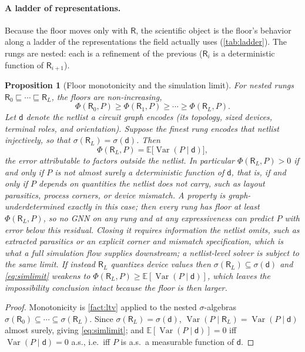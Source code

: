 \documentclass[10pt]{article}
\newtheorem{proposition}{Proposition}
\newcommand{\E}{\mathbb{E}}
\newcommand{\Var}{\operatorname{Var}}
\newcommand{\R}{\mathsf{R}}
\newcommand{\design}{\mathsf{d}}
\begin{document}
\paragraph{A ladder of representations.}
Because the floor moves only with $\R$, the scientific object is the floor's behavior along a ladder of the representations the field actually uses (\cref{tab:ladder}). The rungs are nested: each is a refinement of the previous ($\R_i$ is a deterministic function of $\R_{i+1}$).

\begin{proposition}[Floor monotonicity and the simulation limit]
\label{prop:ladder}
For nested rungs $\R_0\sqsubseteq\cdots\sqsubseteq\R_L$, the floors are non-increasing,
\[
\Phi(\R_0,P)\ge \Phi(\R_1,P)\ge\cdots\ge \Phi(\R_L,P).
\]
Let $\design$ denote the netlist a circuit graph encodes (its topology, sized devices, terminal roles, and orientation). Suppose the finest rung encodes that netlist injectively, so that $\sigma(\R_L)=\sigma(\design)$. Then
\begin{equation}
\Phi(\R_L,P)=\E\!\big[\Var(P\mid \design)\big],
\label{eq:simlimit}
\end{equation}
the error attributable to factors outside the netlist. In particular $\Phi(\R_L,P)>0$ if and only if $P$ is not almost surely a deterministic function of $\design$, that is, if and only if $P$ depends on quantities the netlist does not carry, such as layout parasitics, process corners, or device mismatch. A property is graph-underdetermined exactly in this case; then every rung has floor at least $\Phi(\R_L,P)$, so no GNN on any rung and at any expressiveness can predict $P$ with error below this residual. Closing it requires information the netlist omits, such as extracted parasitics or an explicit corner and mismatch specification, which is what a full simulation flow supplies downstream; a netlist-level solver is subject to the same limit. If instead $\R_L$ quantizes device values then $\sigma(\R_L)\subseteq\sigma(\design)$ and \cref{eq:simlimit} weakens to $\Phi(\R_L,P)\ge\E[\Var(P\mid\design)]$, which leaves the impossibility conclusion intact because the floor is then larger.
\end{proposition}

\begin{proof}
Monotonicity is \cref{fact:ltv} applied to the nested $\sigma$-algebras $\sigma(\R_0)\subseteq\cdots\subseteq\sigma(\R_L)$. Since $\sigma(\R_L)=\sigma(\design)$, $\Var(P\mid\R_L)=\Var(P\mid\design)$ almost surely, giving \cref{eq:simlimit}; and $\E[\Var(P\mid\design)]=0$ iff $\Var(P\mid\design)=0$ a.s., i.e.\ iff $P$ is a.s.\ a measurable function of $\design$.
\end{proof}
\end{document}
